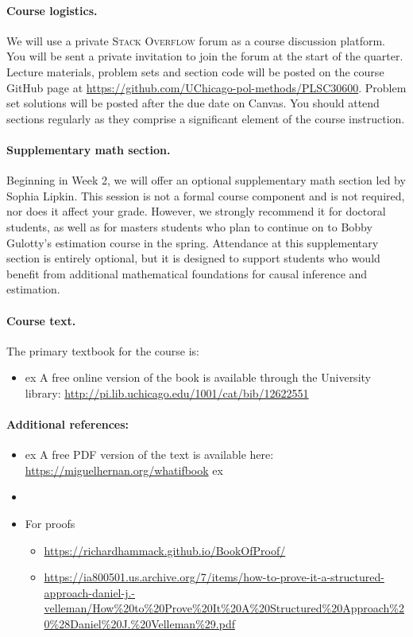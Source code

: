 \documentclass[letterpaper, 12pt, parskip=full,DIV=10]{scrartcl}
\begin{document}
\paragraph{Course logistics.} 
We will use a private \textsc{Stack Overflow} forum as a course discussion platform. 
You will be sent a private invitation to join the forum at the start of the quarter. 
Lecture materials, problem sets and section code will be posted on the course GitHub page at \url{https://github.com/UChicago-pol-methods/PLSC30600}. 
Problem set solutions will be posted after the due date on Canvas. 
You should attend sections regularly as they comprise a significant element of the course instruction.

\paragraph{Supplementary math section.} 
Beginning in Week 2, we will offer an optional supplementary math section led by Sophia Lipkin. 
This session is not a formal course component and is not required, nor does it affect your grade. 
However, we strongly recommend it for doctoral students, as well as for masters students who plan to continue on to Bobby Gulotty's estimation course in the spring. 
Attendance at this supplementary section is entirely optional, but it is designed to support students who would benefit from additional mathematical foundations for causal inference and estimation. 

\paragraph{Course text.} 
The primary textbook for the course is:
\begin{itemize}
\item {}  ex
A free online version of the book is available through the University library: \url{http://pi.lib.uchicago.edu/1001/cat/bib/12622551}
\end{itemize}


\paragraph{Additional references:}
\begin{itemize}
\item {}  ex
A free PDF version of the text is available here: \url{https://miguelhernan.org/whatifbook}  ex
\item {} 
\item For proofs
\begin{itemize}
\item {} \url{https://richardhammack.github.io/BookOfProof/}
\item {} \url{https://ia800501.us.archive.org/7/items/how-to-prove-it-a-structured-approach-daniel-j.-velleman/How%20to%20Prove%20It%20A%20Structured%20Approach%20%28Daniel%20J.%20Velleman%29.pdf}
\end{itemize}
\end{itemize}
\end{document}
